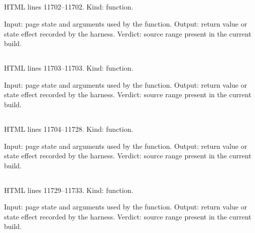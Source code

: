 \subsection*{\texttt{}}
\label{vf_657_astClose}
HTML lines 11702--11702. Kind: function.

Input: page state and arguments used by the function.
Output: return value or state effect recorded by the harness.
Verdict: source range present in the current build.

\subsection*{\texttt{}}
\label{vf_658_astToggle}
HTML lines 11703--11703. Kind: function.

Input: page state and arguments used by the function.
Output: return value or state effect recorded by the harness.
Verdict: source range present in the current build.

\subsection*{\texttt{}}
\label{vf_659_astInit}
HTML lines 11704--11728. Kind: function.

Input: page state and arguments used by the function.
Output: return value or state effect recorded by the harness.
Verdict: source range present in the current build.

\subsection*{\texttt{}}
\label{vf_660_modesInit}
HTML lines 11729--11733. Kind: function.

Input: page state and arguments used by the function.
Output: return value or state effect recorded by the harness.
Verdict: source range present in the current build.

